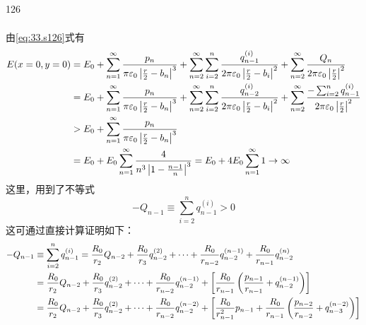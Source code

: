 \begin{solution}{126}
\begin{subsolution}
\begin{align}
        \end{align}
        由\eqref{eq:33.s126}式有
        \begin{align}
            E (x = 0, y = 0) &= E _ {0} + \sum_ {n = 1} ^ {\infty} \frac {p _ {n}}{\pi \varepsilon_ {0} \left| \frac {r}{2} - b _ {n} \right| ^ {3}} + \sum_ {n = 2} ^ {\infty} \sum_ {i = 2} ^ {n} \frac {q _ {n - 1} ^ {(i)}}{2 \pi \varepsilon_ {0} \left| \frac {r}{2} - b _ {i} \right| ^ {2}} + \sum_ {n = 2} ^ {\infty} \frac {Q _ {n}}{2 \pi \varepsilon_ {0} \left| \frac {r}{2} \right| ^ {2}} \notag \\
            &= E _ {0} + \sum_ {n = 1} ^ {\infty} \frac {p _ {n}}{\pi \varepsilon_ {0} \left| \frac {r}{2} - b _ {n} \right| ^ {3}} + \sum_ {n = 2} ^ {\infty} \sum_ {i = 2} ^ {n} \frac {q _ {n - 2} ^ {(i)}}{2 \pi \varepsilon_ {0} \left| \frac {r}{2} - b _ {i} \right| ^ {2}} + \sum_ {n = 2} ^ {\infty} \frac {- \sum_ {i = 2} ^ {n} q _ {n - 1} ^ {(i)}}{2 \pi \varepsilon_ {0} \left| \frac {r}{2} \right| ^ {2}} \notag \\
            &> E _ {0} + \sum_ {n = 1} ^ {\infty} \frac {p _ {n}}{\pi \varepsilon_ {0} \left| \frac {r}{2} - b _ {n} \right| ^ {3}} \notag \\
            &= E _ {0} + E _ {0} \sum_ {n = 1} ^ {\infty} \frac {4}{n ^ {3} \left| 1 - \frac {n - 1}{n} \right| ^ {3}} = E _ {0} + 4 E _ {0} \sum_ {n = 1} ^ {\infty} 1 \rightarrow \infty
            \label{eq:37.s126}
        \end{align}
        这里，用到了不等式
        \begin{equation}
            - Q _ {n - 1} \equiv \sum_ {i = 2} ^ {n} q _ {n - 1} ^ {(i)} > 0
            \label{eq:38.s126}
        \end{equation}
        这可通过直接计算证明如下：
        \begin{align}
            - Q _ {n - 1} &\equiv \sum_ {i = 2} ^ {n} q _ {n - 1} ^ {(i)} = \frac {R _ {0}}{r _ {2}} Q _ {n - 2} + \frac {R _ {0}}{r _ {3}} q _ {n - 2} ^ {(2)} + \dots + \frac {R _ {0}}{r _ {n - 2}} q _ {n - 2} ^ {(n - 1)} + \frac {R _ {0}}{r _ {n - 1}} q _ {n - 2} ^ {(n)} \notag \\
            &= \frac {R _ {0}}{r _ {2}} Q _ {n - 2} + \frac {R _ {0}}{r _ {3}} q _ {n - 2} ^ {(2)} + \dots + \frac {R _ {0}}{r _ {n - 2}} q _ {n - 2} ^ {(n - 1)} + \left[ \frac {R _ {0}}{r _ {n - 1}} \left(\frac {p _ {n - 1}}{r _ {n - 1}} + q _ {n - 2} ^ {(n - 1)}\right) \right] \notag \\
            &= \frac {R _ {0}}{r _ {2}} Q _ {n - 2} + \frac {R _ {0}}{r _ {3}} q _ {n - 2} ^ {(2)} + \dots + \frac {R _ {0}}{r _ {n - 2}} q _ {n - 2} ^ {(n - 2)} + \left[ \frac {R _ {0}}{r _ {n - 1} ^ {2}} p _ {n - 1} + \frac {R _ {0}}{r _ {n - 1}} \left(\frac {p _ {n - 2}}{r _ {n - 2}} + q _ {n - 3} ^ {(n - 2)}\right) \right] \notag \\

\end{align}
\end{subsolution}
\end{solution}
